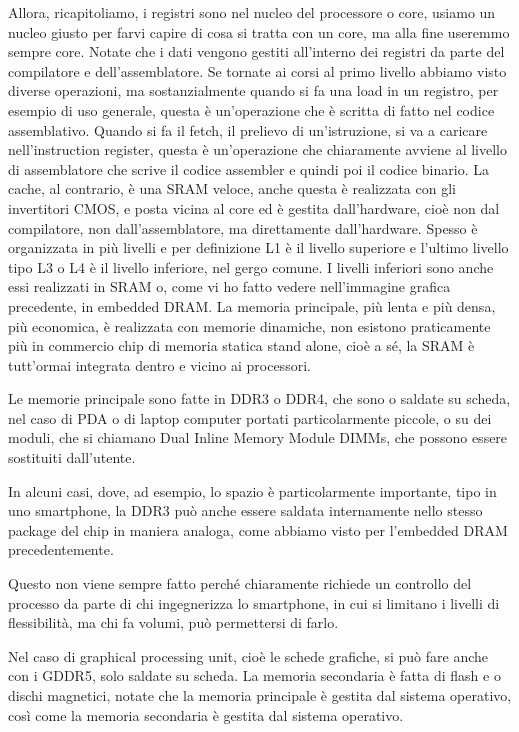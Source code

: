 Allora, ricapitoliamo, i registri sono nel nucleo del processore o core, usiamo un nucleo giusto per farvi capire di cosa si tratta con un core, ma alla fine useremmo sempre core.
Notate che i dati vengono gestiti all'interno dei registri da parte del compilatore e dell'assemblatore.
Se tornate ai corsi al primo livello abbiamo visto diverse operazioni, ma sostanzialmente quando si fa una load in un registro, per esempio di uso generale, questa è un'operazione che è scritta di fatto nel codice assemblativo.
Quando si fa il fetch, il prelievo di un'istruzione, si va a caricare nell'instruction register, questa è un'operazione che chiaramente avviene al livello di assemblatore che scrive il codice assembler e quindi poi il codice binario.
La cache, al contrario, è una SRAM veloce, anche questa è realizzata con gli invertitori CMOS, e posta vicina al core ed è gestita dall'hardware, cioè non dal compilatore, non dall'assemblatore, ma direttamente dall'hardware.
Spesso è organizzata in più livelli e per definizione L1 è il livello superiore e l'ultimo livello tipo L3 o L4 è il livello inferiore, nel gergo comune.
I livelli inferiori sono anche essi realizzati in SRAM o, come vi ho fatto vedere nell'immagine grafica precedente, in embedded DRAM.
La memoria principale, più lenta e più densa, più economica, è realizzata con memorie dinamiche, non esistono praticamente più in commercio chip di memoria statica stand alone, cioè a sé, la SRAM è tutt'ormai integrata dentro e vicino ai processori.

Le memorie principale sono fatte in DDR3 o DDR4, che sono o saldate su scheda, nel caso di PDA o di laptop computer portati particolarmente piccole, o su dei moduli, che si chiamano Dual Inline Memory Module DIMMs, che possono essere sostituiti dall'utente.

In alcuni casi, dove, ad esempio, lo spazio è particolarmente importante, tipo in uno smartphone, la DDR3 può anche essere saldata internamente nello stesso package del chip in maniera analoga, come abbiamo visto per l'embedded DRAM precedentemente.

Questo non viene sempre fatto perché chiaramente richiede un controllo del processo da parte di chi ingegnerizza lo smartphone, in cui si limitano i livelli di flessibilità, ma chi fa volumi, può permettersi di farlo.

Nel caso di graphical processing unit, cioè le schede grafiche, si può fare anche con i GDDR5, solo saldate su scheda.
La memoria secondaria è fatta di flash e o dischi magnetici, notate che la memoria principale è gestita dal sistema operativo, così come la memoria secondaria è gestita dal sistema operativo.


